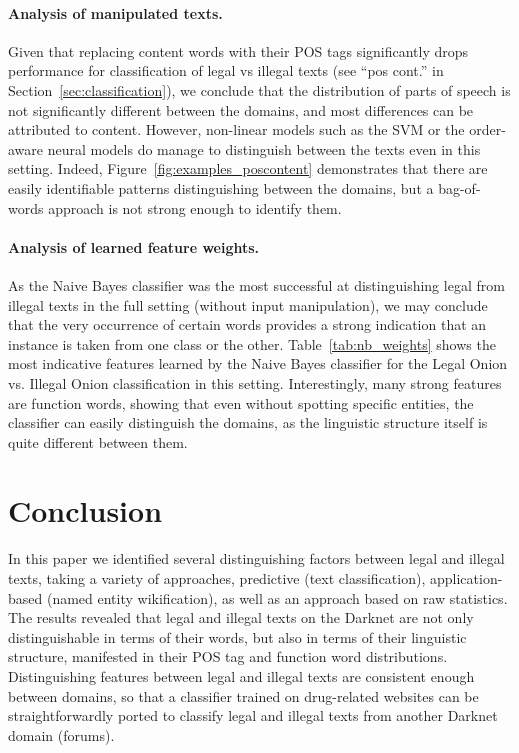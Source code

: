 \documentclass[11pt,a4paper,table]{article}
\begin{document}
  \paragraph{Analysis of manipulated texts.}

    Given that replacing content words with their POS tags significantly drops
    performance for classification of legal vs illegal texts
    (see ``pos cont.'' in Section~\ref{sec:classification}),
    we conclude that the distribution of parts of speech is not significantly
    different between the domains,
    and most differences can be attributed to content.
    However, non-linear models such as the SVM or the order-aware neural models
    do manage to distinguish between the texts even in this setting.
    Indeed, Figure~\ref{fig:examples_poscontent} demonstrates that
    there are easily identifiable patterns distinguishing between the domains,
    but a bag-of-words approach is not strong enough to identify them. 

  \paragraph{Analysis of learned feature weights.}

    As the Naive Bayes classifier was the most successful at distinguishing
    legal from illegal texts in the full setting (without input manipulation),
    we may conclude that the very occurrence of certain words provides a strong indication
    that an instance is taken from one class or the other.
    Table~\ref{tab:nb_weights} shows the most indicative features learned
    by the Naive Bayes classifier for the
    Legal Onion vs. Illegal Onion classification in this setting.
    Interestingly, many strong features are function words,
    showing that even without spotting specific entities,
    the classifier can easily distinguish the domains, as the linguistic structure itself
    is quite different between them.

\section{Conclusion} \label{sec:conclusion}

  In this paper we identified several distinguishing factors between legal and illegal texts, taking
  a variety of approaches, predictive (text classification), application-based (named entity wikification),
  as well as an approach based on raw statistics. The results revealed that legal and illegal texts on the Darknet
  are not only distinguishable in terms of their words, but also in terms of their linguistic structure, manifested
  in their POS tag and function word distributions. Distinguishing features between legal and illegal texts are
  consistent enough between domains, so that a classifier trained on drug-related websites can be straightforwardly
  ported to classify legal and illegal texts from another Darknet domain (forums).
\end{document}
